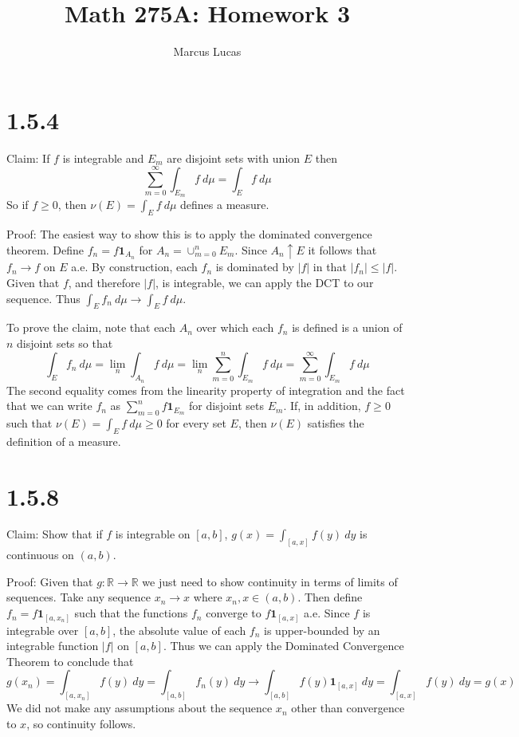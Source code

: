 \documentclass[10pt]{article}
\title{Math 275A: Homework 3}
\author{Marcus Lucas}
\date{\vspace{-1cm}}
\begin{document}
\maketitle


\section*{1.5.4}

Claim: If $f$ is integrable and $E_m$ are disjoint sets
with union $E$ then
\begin{equation*}
  \sum_{m=0}^\infty \int_{E_m}f \ d\mu = \int_E f \ d\mu
\end{equation*}
So if $f \ge 0$, then $\nu(E) = \int_E f \ d\mu$
defines a measure.

Proof: The easiest way to show this is to apply the
dominated convergence theorem. 
Define $f_n = f \mathbf{1}_{A_n}$ for $A_n = \cup_{m=0}^n E_m$.
Since $A_n \uparrow E$ it follows that $f_n \to f$ on $E$ a.e.
By construction, each $f_n$ is dominated by $\vert f \vert$
in that $\vert f_n \vert \le \vert f \vert$.
Given that $f$, and therefore $\vert f \vert$,
is integrable, we can apply the DCT to our sequence.
Thus $\int_E f_n \ d\mu \to \int_E f \ d\mu$.

To prove the claim, note that each $A_n$ over which
each $f_n$ is defined is a union of $n$ disjoint sets
so that
\begin{equation*}
  \int_{E} f_n \ d\mu = \lim_n \int_{A_n} f \ d\mu
  = \lim_n \sum_{m=0}^n \int_{E_m} f \ d\mu
  = \sum_{m=0}^\infty \int_{E_m} f \ d\mu
\end{equation*}
The second equality comes from the linearity property of
integration and the fact that we can write $f_n$
as $\sum_{m=0}^n f \mathbf{1}_{E_m}$ for disjoint 
sets $E_m$.
If, in addition, $f \ge 0$ such that 
$\nu(E) = \int_E f \ d\mu \ge 0$ for every set $E$,
then $\nu(E)$ satisfies the definition of a measure.

\section*{1.5.8}

Claim: Show that if $f$ is integrable on $[a,b]$,
$g(x) = \int_{[a,x]} f(y) \ dy$ is continuous on $(a,b)$.

Proof: Given that $g : \mathbb{R} \to \mathbb{R}$ we 
just need to show continuity in terms of limits of sequences.
Take any sequence $x_n \to x$ where 
$x_n, x \in (a,b)$.
Then define $f_n = f \mathbf{1}_{[a,x_n]}$ 
such that the functions $f_n$ converge
to $f \mathbf{1}_{[a,x]}$ a.e. 
Since $f$ is integrable over $[a,b]$, the absolute value of
each $f_n$ is upper-bounded by an integrable function
$\vert f \vert$ on $[a,b]$.
Thus we can apply the Dominated Convergence Theorem
to conclude that
\begin{equation*}
  g(x_n) = \int_{[a,x_n]} f(y) \ dy = \int_{[a,b]} f_n(y) \ dy \to 
  \int_{[a,b]} f(y) \mathbf{1}_{[a,x]} \ dy 
  = \int_{[a,x]} f(y) \ dy = g(x)
\end{equation*}
We did not make any assumptions about the sequence $x_n$
other than convergence to $x$, so continuity follows.
\end{document}
